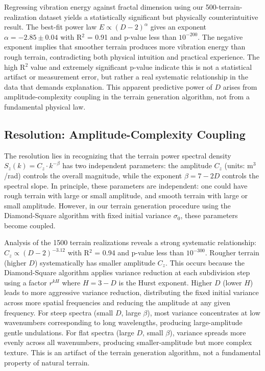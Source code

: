 \documentclass[11pt]{article}
\begin{document}
Regressing vibration energy against fractal dimension using our 500-terrain-realization dataset yields a statistically significant but physically counterintuitive result. The best-fit power law $E \propto (D-2)^\alpha$ gives an exponent $\alpha = -2.85 \pm 0.04$ with R$^2$ = 0.91 and p-value less than $10^{-200}$. The negative exponent implies that smoother terrain produces more vibration energy than rough terrain, contradicting both physical intuition and practical experience. The high R$^2$ value and extremely significant p-value indicate this is not a statistical artifact or measurement error, but rather a real systematic relationship in the data that demands explanation. This apparent predictive power of $D$ arises from amplitude-complexity coupling in the terrain generation algorithm, not from a fundamental physical law.

\subsection{Resolution: Amplitude-Complexity Coupling}

The resolution lies in recognizing that the terrain power spectral density $S_z(k) = C_z \cdot k^{-\beta}$ has two independent parameters: the amplitude $C_z$ (units: m$^3$/rad) controls the overall magnitude, while the exponent $\beta = 7-2D$ controls the spectral slope. In principle, these parameters are independent: one could have rough terrain with large or small amplitude, and smooth terrain with large or small amplitude. However, in our terrain generation procedure using the Diamond-Square algorithm with fixed initial variance $\sigma_0$, these parameters become coupled.

Analysis of the 1500 terrain realizations reveals a strong systematic relationship: $C_z \propto (D-2)^{-3.12}$ with R$^2$ = 0.94 and p-value less than $10^{-300}$. Rougher terrain (higher $D$) systematically has smaller amplitude $C_z$. This occurs because the Diamond-Square algorithm applies variance reduction at each subdivision step using a factor $r^{kH}$ where $H = 3-D$ is the Hurst exponent. Higher $D$ (lower $H$) leads to more aggressive variance reduction, distributing the fixed initial variance across more spatial frequencies and reducing the amplitude at any given frequency. For steep spectra (small $D$, large $\beta$), most variance concentrates at low wavenumbers corresponding to long wavelengths, producing large-amplitude gentle undulations. For flat spectra (large $D$, small $\beta$), variance spreads more evenly across all wavenumbers, producing smaller-amplitude but more complex texture. This is an artifact of the terrain generation algorithm, not a fundamental property of natural terrain.
\end{document}
